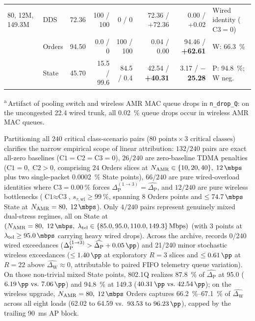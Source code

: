 \documentclass[11pt,a4paper]{article}
\newcommand{\Namr}{\ensuremath{N_{\mathrm{AMR}}}}
\newcommand{\ltel}{\ensuremath{\lambda_{\mathrm{tel}}}}
\newcommand{\GainP}{\ensuremath{\Delta_{\mathrm{P}}}}
\newcommand{\GainW}{\ensuremath{\Delta_{\mathrm{W}}}}
\newcommand{\GainPpair}{\ensuremath{\Delta_{\mathrm{P}}^{(1\to 3)}}}
\begin{document}
\begin{table}[!tb]
\begin{tabular}{@{}l l r r r r r l@{}}
80, 12M, 149.3M & DDS & 72.36 & 100 / 100 & 0 / 0 & 72.36 / +72.36 & 0.00 / +0.02 & Wired identity ($\text{C3}=0$) \\
 & Orders & 94.50 & 0.0 / 0 & 100 / 100 & 0.04 / 0.00 & 94.46 / \textbf{+62.61} & W: \qty{66.3}{\percent} \\
 & State & 45.70 & 15.5 / 99.6 & 84.5 / 0.4 & 42.54 / \textbf{+40.31} & 3.17 / \textbf{$-$25.28} & P: \qty{94.8}{\percent}; W neg. \\
\bottomrule
\end{tabular}
\par\vspace{2pt}
\raggedright\scriptsize
\textsuperscript{a}\,Artifact of pooling switch and wireless AMR MAC queue drops in \texttt{n\_drop\_Q}: on the uncongested \qty{22.4}{\mbps} wired trunk, all \qty{0.02}{\percent} queue drops occur in wireless AMR MAC queues.
\end{table}

Partitioning all $240$ critical class-scenario pairs ($80\text{ points} \times 3\text{ critical classes}$) clarifies the narrow empirical scope of linear attribution: $132/240$ pairs are exact all-zero baselines ($\text{C1}=\text{C2}=\text{C3}=0$), $26/240$ are zero-baseline TDMA penalties ($\text{C1}=0,\; \text{C2}>0$, comprising $24$ Orders slices at $\Namr \in \{10, 20, 40\},\; \qty{12}{\mbps}$ plus two single-packet \qty{0.0002}{\percent} State points), $66/240$ are pure wired-overload identities where $\text{C3}=\qty{0.00}{\percent}$ forces $\GainPpair = \widehat{\GainP}$, and $12/240$ are pure wireless bottlenecks ($\text{C1}\approx\text{C3}$, $s_{\tau,\mathrm{wl}}\ge \qty{99}{\percent}$, spanning $8$ Orders points and $\le \qty{74.7}{\mbps}$ State at $\Namr=80,\; \qty{12}{\mbps}$). Only $4/240$ pairs represent genuinely mixed dual-stress regimes, all on State at $(\Namr=80,\; \qty{12}{\mbps},\; \ltel \in \{85.0, 95.0, 110.0, 149.3\}\,\text{Mbps})$ (with $3$ points at $\ltel \ge \qty{95.0}{\mbps}$ carrying heavy wired drops). Across the archive,  records \num{0}/240 wired exceedances ($\GainPpair > \widehat{\GainP} + \qty{0.05}{\pp}$) and \num{21}/240 minor stochastic wireless exceedances ($\le \qty{1.40}{\pp}$ at exploratory $R=3$ slices and $\le \qty{0.61}{\pp}$ at $R=22$ above $\widehat{\GainW} \approx 0$, attributable to paired FIFO telemetry queue variation). On those non-trivial mixed State points, 802.1Q realizes \qty{87.8}{\percent} of $\widehat{\GainP}$ at \qty{95.0}{\mbps} ($\qty{+6.19}{\pp}\text{ vs.\ }\qty{7.06}{\pp}$) and \qty{94.8}{\percent} at \qty{149.3}{\mbps} ($\qty{+40.31}{\pp}\text{ vs.\ }\qty{42.54}{\pp}$); on the wireless upgrade, $\Namr=80,\; \qty{12}{\mbps}$ Orders captures \qtyrange{66.2}{67.1}{\percent} of $\widehat{\GainW}$ across all eight loads (\qty{+62.02}{\pp} to \qty{+64.59}{\pp} vs.\ $93.53\text{ to }\qty{96.23}{\pp}$), capped by the trailing \qty{90}{\milli\second} AP block.
\end{document}
